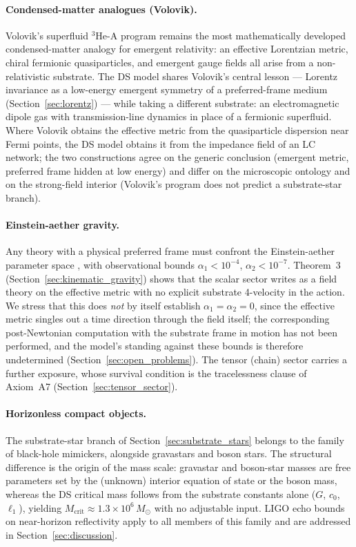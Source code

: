 \documentclass[11pt,a4paper]{article}
\theoremstyle{plain}
\theoremstyle{remark}
\begin{document}
\paragraph{Condensed-matter analogues (Volovik).} Volovik's superfluid $^3$He-A program \cite{volovik} remains the most mathematically developed condensed-matter analogy for emergent relativity: an effective Lorentzian metric, chiral fermionic quasiparticles, and emergent gauge fields all arise from a non-relativistic substrate. The DS model shares Volovik's central lesson --- Lorentz invariance as a low-energy emergent symmetry of a preferred-frame medium (Section~\ref{sec:lorentz}) --- while taking a different substrate: an electromagnetic dipole gas with transmission-line dynamics in place of a fermionic superfluid. Where Volovik obtains the effective metric from the quasiparticle dispersion near Fermi points, the DS model obtains it from the impedance field of an LC network; the two constructions agree on the generic conclusion (emergent metric, preferred frame hidden at low energy) and differ on the microscopic ontology and on the strong-field interior (Volovik's program does not predict a substrate-star branch).

\paragraph{Einstein-aether gravity.} Any theory with a physical preferred frame must confront the Einstein-aether parameter space \cite{jacobson_ae, will_ppn}, with observational bounds $\alpha_1 < 10^{-4}$, $\alpha_2 < 10^{-7}$. Theorem~3 (Section~\ref{sec:kinematic_gravity}) shows that the scalar sector writes as a field theory on the effective metric with no explicit substrate 4-velocity in the action. We stress that this does \emph{not} by itself establish $\alpha_1 = \alpha_2 = 0$, since the effective metric singles out a time direction through the field itself; the corresponding post-Newtonian computation with the substrate frame in motion has not been performed, and the model's standing against these bounds is therefore undetermined (Section~\ref{sec:open_problems}). The tensor (chain) sector carries a further exposure, whose survival condition is the tracelessness clause of Axiom~A7 (Section~\ref{sec:tensor_sector}).

\paragraph{Horizonless compact objects.} The substrate-star branch of Section~\ref{sec:substrate_stars} belongs to the family of black-hole mimickers, alongside gravastars \cite{mazur2001, mazur2023} and boson stars. The structural difference is the origin of the mass scale: gravastar and boson-star masses are free parameters set by the (unknown) interior equation of state or the boson mass, whereas the DS critical mass follows from the substrate constants alone ($G$, $c_0$, $\ell_1$), yielding $M_{\text{crit}} \approx 1.3\times10^{6}\,M_\odot$ with no adjustable input. LIGO echo bounds on near-horizon reflectivity \cite{GW170817} apply to all members of this family and are addressed in Section~\ref{sec:discussion}.
\end{document}
